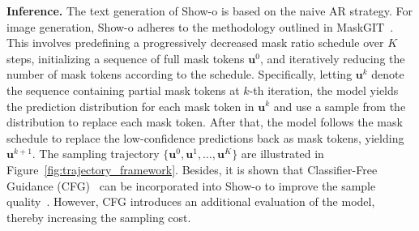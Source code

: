 \noindent \textbf{Inference.}
The text generation of Show-o is based on the naive AR strategy. 
For image generation, Show-o adheres to the methodology outlined in MaskGIT~\cite{chang2022maskgit}. This involves predefining a progressively decreased mask ratio schedule over $K$ steps, initializing a sequence of full mask tokens $\mathbf{u}^0$, and iteratively reducing the number of mask tokens according to the schedule.
Specifically, letting $\mathbf{u}^{k}$ denote the sequence containing partial mask tokens at $k$-th iteration, the model yields the prediction distribution for each mask token in $\mathbf{u}^{k}$ and use a sample from the distribution to replace each mask token. 
After that, the model follows the mask schedule to replace the low-confidence predictions back as mask tokens, yielding $\mathbf{u}^{k+1}$. 
The sampling trajectory $\{ \mathbf{u}^{0},\mathbf{u}^{1},\ldots,\mathbf{u}^K\}$ are illustrated in Figure~\ref{fig:trajectory_framework}. %
Besides, it is shown that Classifier-Free Guidance (CFG)~\cite{ho2021classifier} can be incorporated into Show-o to improve the sample quality~\cite{xie2024show}. 
However, CFG introduces an additional evaluation of the model, thereby increasing the sampling cost.
%

